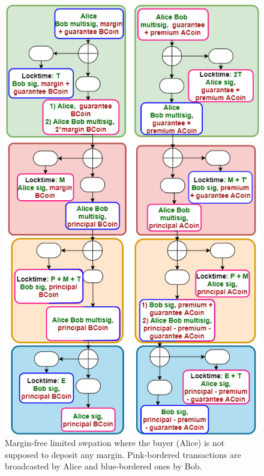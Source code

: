 \begin{figure}
    \centering
    \includegraphics[width=\textwidth,height=0.93\textheight]{figures/swaption-margin-free.png}
    \caption{Margin-free limited swpation where the buyer (Alice) is not supposed to deposit any margin. Pink-bordered transactions are broadcasted by Alice and blue-bordered ones by Bob.}
    \label{fig:swaption-margin-free-limited}
\end{figure}

